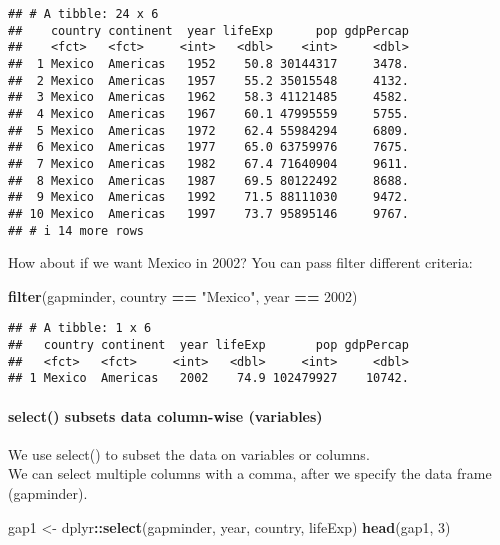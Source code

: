 \documentclass[
]{article}
\newenvironment{Shaded}{\begin{snugshade}}{\end{snugshade}}
\newcommand{\DecValTok}[1]{\textcolor[rgb]{0.00,0.00,0.81}{#1}}
\newcommand{\FunctionTok}[1]{\textcolor[rgb]{0.13,0.29,0.53}{\textbf{#1}}}
\newcommand{\NormalTok}[1]{#1}
\newcommand{\OtherTok}[1]{\textcolor[rgb]{0.56,0.35,0.01}{#1}}
\newcommand{\SpecialCharTok}[1]{\textcolor[rgb]{0.81,0.36,0.00}{\textbf{#1}}}
\newcommand{\StringTok}[1]{\textcolor[rgb]{0.31,0.60,0.02}{#1}}
\begin{document}
\begin{verbatim}
## # A tibble: 24 x 6
##    country continent  year lifeExp      pop gdpPercap
##    <fct>   <fct>     <int>   <dbl>    <int>     <dbl>
##  1 Mexico  Americas   1952    50.8 30144317     3478.
##  2 Mexico  Americas   1957    55.2 35015548     4132.
##  3 Mexico  Americas   1962    58.3 41121485     4582.
##  4 Mexico  Americas   1967    60.1 47995559     5755.
##  5 Mexico  Americas   1972    62.4 55984294     6809.
##  6 Mexico  Americas   1977    65.0 63759976     7675.
##  7 Mexico  Americas   1982    67.4 71640904     9611.
##  8 Mexico  Americas   1987    69.5 80122492     8688.
##  9 Mexico  Americas   1992    71.5 88111030     9472.
## 10 Mexico  Americas   1997    73.7 95895146     9767.
## # i 14 more rows
\end{verbatim}

How about if we want Mexico in 2002? You can pass filter different
criteria:

\begin{Shaded}
\begin{Highlighting}[]
\FunctionTok{filter}\NormalTok{(gapminder, country }\SpecialCharTok{==} \StringTok{"Mexico"}\NormalTok{, year }\SpecialCharTok{==} \DecValTok{2002}\NormalTok{)}
\end{Highlighting}
\end{Shaded}

\begin{verbatim}
## # A tibble: 1 x 6
##   country continent  year lifeExp       pop gdpPercap
##   <fct>   <fct>     <int>   <dbl>     <int>     <dbl>
## 1 Mexico  Americas   2002    74.9 102479927    10742.
\end{verbatim}

\paragraph{select() subsets data column-wise
(variables)}\label{select-subsets-data-column-wise-variables}

We use select() to subset the data on variables or columns.\\
We can select multiple columns with a comma, after we specify the data
frame (gapminder).

\begin{Shaded}
\begin{Highlighting}[]
\NormalTok{gap1 }\OtherTok{\textless{}{-}}\NormalTok{ dplyr}\SpecialCharTok{::}\FunctionTok{select}\NormalTok{(gapminder, year, country, lifeExp)}
\FunctionTok{head}\NormalTok{(gap1, }\DecValTok{3}\NormalTok{)}
\end{Highlighting}
\end{Shaded}
\end{document}
